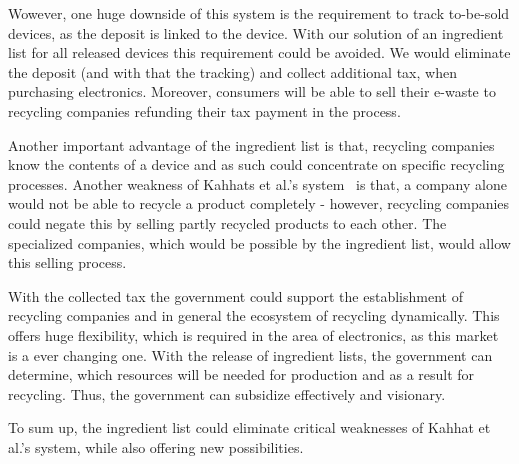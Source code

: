 Wowever, one huge downside of this system is the requirement to track to-be-sold devices, 
as the deposit is linked to the device. With our solution of an ingredient list for 
all released devices  this requirement could be avoided. We would eliminate the deposit 
(and with that the tracking) and collect additional tax, when purchasing electronics. 
Moreover, consumers will be able to sell their e-waste to recycling companies refunding their tax payment in the process. 

Another important advantage of the ingredient list is that, recycling companies know the 
contents of a device and as such could concentrate on specific recycling processes. 
Another weakness of Kahhats et al.'s system~\cite{kahhat2008exploring} is that, a company alone would not 
be able to recycle a product completely - however, recycling companies could negate this 
by selling partly recycled products to each other. The specialized companies, which would 
be possible by the ingredient list, would allow this selling process.

With the collected tax the government could support the establishment of recycling companies 
and in general the ecosystem of recycling dynamically. This offers huge flexibility, which 
is required in the area of electronics, as this market is a ever changing one. With the 
release of ingredient lists, the government can determine, which resources will be needed 
for production and  as a result for recycling. Thus, the government can subsidize effectively and visionary.

To sum up, the ingredient list could eliminate critical weaknesses of Kahhat et al.'s system, 
while also offering new possibilities.


\label{applications}